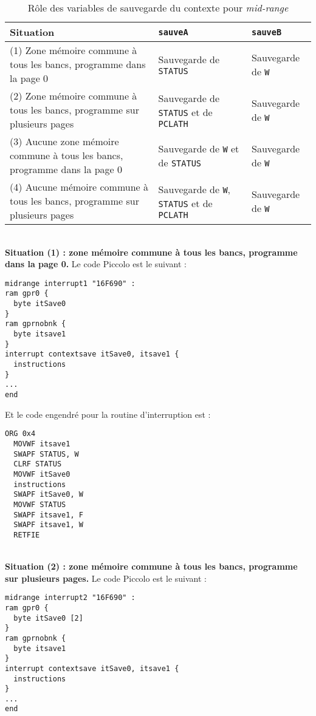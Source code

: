 \begin{table}[!ht]
  \centering
  \begin{tabular}{p{5cm}p{5cm}l}
    \textbf{Situation} & \texttt{\bf sauveA} & \texttt{\bf sauveB}\\
    \hline
    (1) Zone mémoire commune à tous les bancs, programme dans la page 0 & Sauvegarde de \texttt{STATUS} & Sauvegarde de \texttt{W}\\
    (2) Zone mémoire commune à tous les bancs, programme sur plusieurs pages & Sauvegarde de \texttt{STATUS} et de \texttt{PCLATH} & Sauvegarde de \texttt{W}\\
    (3) Aucune zone mémoire commune à tous les bancs, programme dans la page 0 & Sauvegarde de \texttt{W} et de \texttt{STATUS} & Sauvegarde de \texttt{W}\\
    (4) Aucune mémoire commune à tous les bancs, programme sur plusieurs pages & Sauvegarde de \texttt{W}, \texttt{STATUS} et de \texttt{PCLATH} & Sauvegarde de \texttt{W}\\
  \hline
  \end{tabular}
  \caption{Rôle des variables de sauvegarde du contexte pour \emph{mid-range}}
\end{table}


~\\
\textbf{Situation (1) : zone mémoire commune à tous les bancs, programme dans la page 0.} Le code Piccolo est le suivant :
\begin{lstlisting}[language=piccolo]
midrange interrupt1 "16F690" :
ram gpr0 {
  byte itSave0 
}
ram gprnobnk {
  byte itsave1
}
interrupt contextsave itSave0, itsave1 {
  instructions
}
...
end
\end{lstlisting}

Et le code engendré pour la routine d'interruption est :
\begin{lstlisting}[language=assembleur]
  ORG 0x4
  MOVWF itsave1
  SWAPF STATUS, W
  CLRF STATUS
  MOVWF itSave0
  instructions
  SWAPF itSave0, W
  MOVWF STATUS
  SWAPF itsave1, F
  SWAPF itsave1, W
  RETFIE
\end{lstlisting}



~\\
\textbf{Situation (2) : zone mémoire commune à tous les bancs, programme sur plusieurs pages.} Le code Piccolo est le suivant :
\begin{lstlisting}[language=piccolo]
midrange interrupt2 "16F690" :
ram gpr0 {
  byte itSave0 [2]
}
ram gprnobnk {
  byte itsave1
}
interrupt contextsave itSave0, itsave1 {
  instructions
}
...
end
\end{lstlisting}

